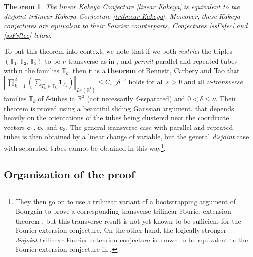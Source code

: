 \documentclass{amsart}%
\newtheorem{theorem}{Theorem}
\theoremstyle{plain}
\numberwithin{equation}{section}
\begin{document}
\begin{theorem}
\label{big}The linear Kakeya Conjecture \ref{linear Kakeya} is equivalent to
the \emph{disjoint} trilinear Kakeya Conjecture \ref{trilinear Kakeya}.
Moreover, these Kakeya conjectures are equivalent to their Fourier
counterparts, Conjectures \ref{ssFsfec} and \ref{ssFsftec} below.
\end{theorem}

To put this theorem into context, we note that if we both \emph{restrict} the
triples $\left(  \mathbb{T}_{1},\mathbb{T}_{2},\mathbb{T}_{3}\right)  $ to be
$\nu$-transverse as in \cite{BeCaTa}, and \emph{permit} parallel and repeated
tubes within the families $\mathbb{T}_{k}$, then it is a \textbf{theorem} of
Bennett, Carbery and Tao \cite[Theorem 1.15]{BeCaTa} that $\left\Vert
\prod_{k=1}^{3}\left(  \sum_{T_{k}\in\mathbb{T}_{k}}\mathbf{1}_{T_{k}}\right)
\right\Vert _{L^{\frac{1}{2}}\left(  \mathbb{R}^{3}\right)  }\leq
C_{\varepsilon,\nu}\delta^{-\varepsilon}$ holds for all $\varepsilon>0$ and
all $\nu$\emph{-transverse }families $\mathbb{T}_{k}$ of $\delta$-tubes in
$\mathbb{R}^{3}$ (not necessarily $\delta$-separated) and $0<\delta\leq\nu$.
Their theorem is proved using a beautiful sliding Gaussian argument, that
depends heavily on the orientations of the tubes being clustered near the
coordinate vectors $\mathbf{e}_{1}$, $\mathbf{e}_{2}$ and $\mathbf{e}_{3}$.
The general transverse case with parallel and repeated tubes is then obtained
by a linear change of variable, but the general \emph{disjoint} case with
separated tubes cannot be obtained in this way\footnote{They then go on to use
a trilinear variant of a bootstrapping argument of Bourgain to prove a
corresponding transverse trilinear Fourier extension theorem \cite[Theorem
1.17]{BeCaTa}, but this transverse result is not yet known to be sufficient
for the Fourier extension conjecture. On the other hand, the logically
stronger \emph{disjoint} trilinear Fourier extension conjecture is shown to be
equivalent to the Fourier extension conjecture in \cite{RiSa}.}.

\subsection{Organization of the proof}
\end{document}
